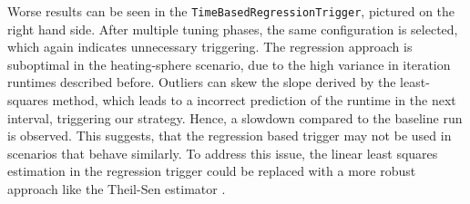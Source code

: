Worse results can be seen in the \texttt{TimeBasedRegressionTrigger}, pictured on the right hand side. After multiple tuning phases, the same configuration is selected, which again indicates unnecessary triggering. The regression approach is suboptimal in the heating-sphere scenario, due to the high variance in iteration runtimes described before. Outliers can skew the slope derived by the least-squares method, which leads to a incorrect prediction of the runtime in the next interval, triggering our strategy. Hence, a slowdown compared to the baseline run is observed. This suggests, that the regression based trigger may not be used in scenarios that behave similarly. To address this issue, the linear least squares estimation in the regression trigger could be replaced with a more robust approach like the Theil-Sen estimator \cite{Wilcox2012}.



